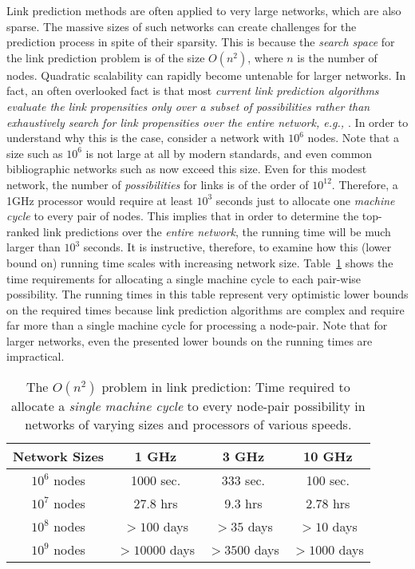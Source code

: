 Link prediction methods are often applied to very large networks,
which are also sparse.  The massive sizes of such networks can
create challenges for the prediction process in spite of their
sparsity. This is because the {\em search space} for the link
prediction problem is of the size $O(n^2)$, where $n$ is the number
of nodes. Quadratic scalability can rapidly become untenable for
larger networks. In fact, an often overlooked fact is that most {\em
current link prediction algorithms evaluate the link
propensities only over a subset of possibilities rather than
exhaustively search for link propensities over the entire network, e.g.,
\cite{dwang,lee}}.
%
%
In order to understand why this is the case,
consider a network with $10^6$ nodes. Note that a size such as
$10^6$ is not large at all by modern standards, and even common
bibliographic networks such as \DBLP now exceed this size. Even
for this modest network, the number of {\em possibilities} for links
is of the order of $10^{12}$. Therefore, a 1GHz processor would
require at least $10^3$ seconds just to allocate one {\em machine cycle} to
every pair of nodes. This implies that in order to determine the
top-ranked link predictions over the {\em entire network}, the
running time will be much larger than $10^3$ seconds.  It is
instructive, therefore, to examine how this (lower bound on) running
time scales with increasing network size. Table~\ref{time} shows the
time requirements for allocating a single machine cycle to each
pair-wise possibility. The running times in this table represent
very optimistic lower bounds on the required times because link
prediction algorithms are complex and require far more than a single
machine cycle for processing a node-pair. Note that for larger
networks, even the presented lower bounds on the running times are
impractical.
\begin{table}
\caption{The $O(n^2)$ problem in link prediction: Time required to
allocate a {\em single machine cycle} to every node-pair possibility
in networks of varying sizes and processors of various speeds.}
\label{time}
\vspace{-2ex}
\centering
\begin{tabular}{cccc}
\hline \hline Network Sizes & 1 GHz &  3 GHz & 10 GHz \\
\hline \hline $10^6$ nodes & 1000 sec. & 333 sec. & 100 sec.\\
\hline $10^7$ nodes & 27.8 hrs &  9.3 hrs &  2.78 hrs\\
\hline $10^8$ nodes & $>100$ days &  $>35$ days & $> 10$ days\\
\hline $10^9$ nodes & $>10000$ days & $>3500$ days & $> 1000$ days\\
\hline \hline
\end{tabular}
\end{table}


